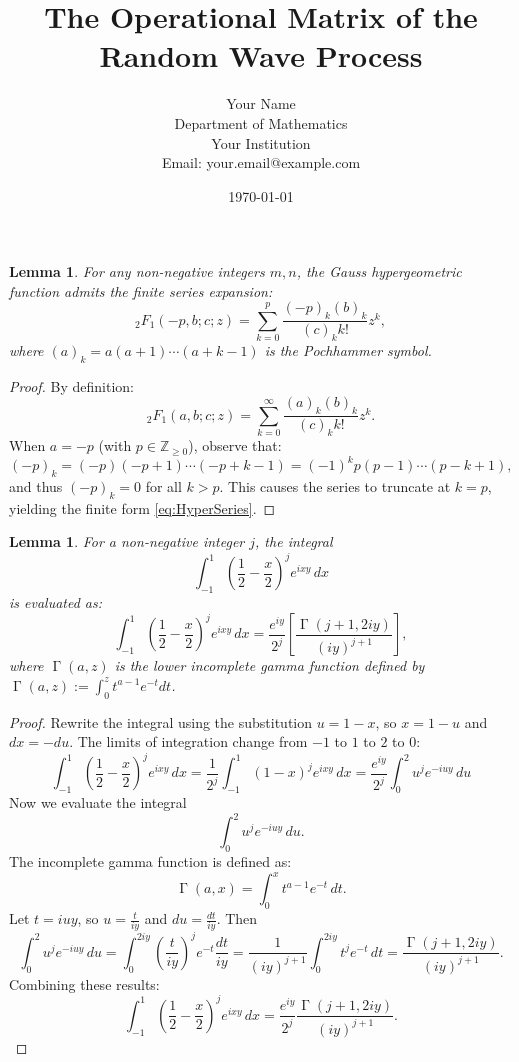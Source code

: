 \documentclass[12pt]{article}
\title{The Operational Matrix of the Random Wave Process}
\author{Your Name \\ Department of Mathematics \\ Your Institution \\ Email: your.email@example.com}
\date{\today}
\newtheorem{lemma}[theorem]{Lemma}
\DeclareMathOperator{\gamma}{\Gamma}
\begin{document}
\maketitle

\begin{lemma}\label{lem:HyperExpansions}
For any non-negative integers $m, n$, the Gauss hypergeometric function admits the finite series expansion:
\begin{equation}\label{eq:HyperSeries}
{}_2F_1(-p, b; c; z) = \sum_{k=0}^p \frac{(-p)_k (b)_k}{(c)_k k!} z^k,
\end{equation}
where $(a)_k = a(a+1)\cdots(a+k-1)$ is the Pochhammer symbol.
\end{lemma}

\begin{proof}
By definition:
\[
{}_2F_1(a, b; c; z) = \sum_{k=0}^\infty \frac{(a)_k (b)_k}{(c)_k k!} z^k.
\]
When $a = -p$ (with \( p \in \mathbb{Z}_{\geq 0} \)), observe that:
\[
(-p)_k = (-p)(-p+1)\cdots(-p+k-1) = (-1)^k p(p-1)\cdots(p-k+1),
\]
and thus $(-p)_k = 0$ for all $k>p$. This causes the series to truncate at $k=p$, yielding the finite form \eqref{eq:HyperSeries}.
\end{proof}

\begin{lemma}\label{lem:IntegralGamma}
For a non-negative integer $j$, the integral
\[
\int_{-1}^1 \left(\frac{1}{2}-\frac{x}{2}\right)^j e^{i x y} \, dx
\]
is evaluated as:
\begin{equation}\label{eq:IntegralGamma}
\int_{-1}^1 \left(\frac{1}{2}-\frac{x}{2}\right)^j e^{i x y} \, dx =
\frac{e^{iy}}{2^j}\left[\frac{\gamma(j+1,2iy)}{(iy)^{j+1}}\right],
\end{equation}
where $\gamma(a, z)$ is the lower incomplete gamma function defined by $\gamma(a, z) := \int_0^z t^{a-1} e^{-t} dt$.
\end{lemma}

\begin{proof}
Rewrite the integral using the substitution \(u = 1 - x\), so \(x = 1 - u\) and \(dx = -du\). The limits of integration change from $-1$ to $1$ to $2$ to $0$:
\[
\int_{-1}^1 \left(\frac{1}{2} - \frac{x}{2}\right)^j e^{i x y} \, dx = \frac{1}{2^j} \int_{-1}^1 (1-x)^j e^{i x y} \, dx = \frac{e^{iy}}{2^j} \int_{0}^{2} u^j e^{-i u y} \, du
\]
Now we evaluate the integral
\[
\int_0^2 u^j e^{-i u y} \, du.
\]
The incomplete gamma function is defined as:
\[
\gamma(a, x) = \int_0^x t^{a-1} e^{-t} \, dt.
\]
Let \(t = iuy\), so \(u = \frac{t}{iy}\) and \(du = \frac{dt}{iy}\). Then
\[
\int_0^2 u^j e^{-i u y} \, du = \int_0^{2iy} \left(\frac{t}{iy}\right)^j e^{-t} \frac{dt}{iy} = \frac{1}{(iy)^{j+1}} \int_0^{2iy} t^j e^{-t} \, dt = \frac{\gamma(j+1, 2iy)}{(iy)^{j+1}}.
\]
Combining these results:
\[
\int_{-1}^1 \left(\frac{1}{2} - \frac{x}{2}\right)^j e^{i x y} \, dx = \frac{e^{iy}}{2^j} \frac{\gamma(j+1, 2iy)}{(iy)^{j+1}}.
\]
\end{proof}
\end{document}
